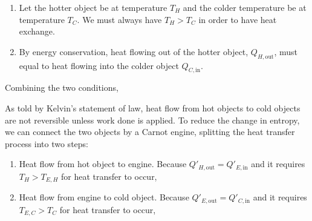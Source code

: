 \documentclass[class=article, crop=false, 12pt]{standalone}
\begin{document}
\begin{enumerate}
    \item Let the hotter object be at temperature $T_H$ and the colder temperature be at temperature $T_C$.
    We must always have $T_H>T_C$ in order to have heat exchange.

    \item By energy conservation, 
    heat flowing out of the hotter object, $Q_{H,\text{out}}$, must equal to heat flowing into the colder object $Q_{C,\text{in}}$.

\end{enumerate}

Combining the two conditions, 

As told by Kelvin's statement of  law, 
heat flow from hot objects to cold objects are not reversible unless work done is applied.
To reduce the change in entropy, 
we can connect the two objects by a Carnot engine,
splitting the heat transfer process into two steps:
\begin{enumerate}
    \item Heat flow from hot object to engine.
    Because $Q'_{H,\text{out}} = Q'_{E,\text{in}}$ and it requires $T_H > T_{E,H}$ for heat transfer to occur,


    \item Heat flow from engine to cold object.
    Because $Q'_{E,\text{out}} = Q'_{C,\text{in}}$ and it requires $T_{E,C} > T_C$ for heat transfer to occur,


\end{enumerate}
\end{document}
